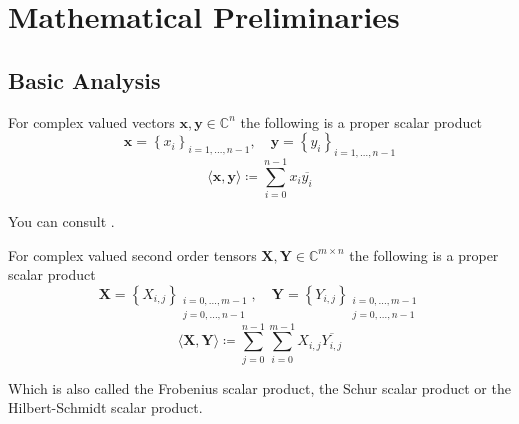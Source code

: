 \chapter{Mathematical Preliminaries}
\section{Basic Analysis}
\begin{Prop}
    For complex valued vectors $\boldsymbol{x},\boldsymbol{y} \in \mathbb{C}^n$ the following is a proper scalar product
    \begin{equation*}
        \boldsymbol{x} = \left\{x_i\right\}_{i=1,\ldots,n-1}, \quad \boldsymbol{y} = \left\{y_i\right\}_{i=1,\ldots,n-1}
    \end{equation*}
    \begin{equation*}
        \langle\boldsymbol{x},\boldsymbol{y}\rangle \coloneqq \sum_{i=0}^{n-1} x_i \overline{y_i} 
    \end{equation*}
\end{Prop}
\begin{Proof}
    You can consult \cite{Frazier1999}\cite{Horn2012}\cite{Hackbusch2019}.
\end{Proof}
\begin{Prop}
    For complex valued second order tensors $\boldsymbol{X},\boldsymbol{Y} \in \mathbb{C}^{m \times n}$ the following is a proper scalar product
    \begin{equation*}
        \boldsymbol{X} = \left\{X_{i,j}\right\}_{\substack{i=0,\ldots,m-1\\ j=0,\ldots,n-1}}, \quad \boldsymbol{Y} = \left\{Y_{i,j}\right\}_{\substack{i=0,\ldots,m-1\\ j=0,\ldots,n-1}}
    \end{equation*}
    \begin{equation*}
        \langle\boldsymbol{X},\boldsymbol{Y}\rangle \coloneqq \sum_{j=0}^{n-1}\sum_{i=0}^{m-1} X_{i,j} \overline{Y_{i,j}} 
    \end{equation*}
\end{Prop}

Which is also called the Frobenius scalar product, the Schur scalar product or 
the Hilbert-Schmidt scalar product.

